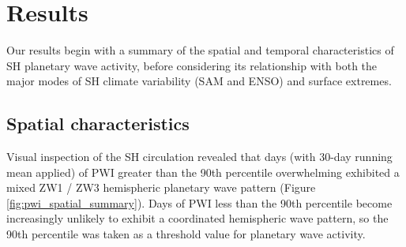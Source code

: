 \section{Results}

Our results begin with a summary of the spatial and temporal characteristics of SH planetary wave activity, before considering its relationship with both the major modes of SH climate variability (SAM and ENSO) and surface extremes. 

\subsection{Spatial characteristics}\label{s:spatial_characteristics}

Visual inspection of the SH circulation revealed that days (with 30-day running mean applied) of PWI greater than the 90th percentile overwhelming exhibited a mixed ZW1 / ZW3 hemispheric planetary wave pattern (Figure \ref{fig:pwi_spatial_summary}). Days of PWI less than the 90th percentile become increasingly unlikely to exhibit a coordinated hemispheric wave pattern, so the 90th percentile was taken as a threshold value for planetary wave activity. 
